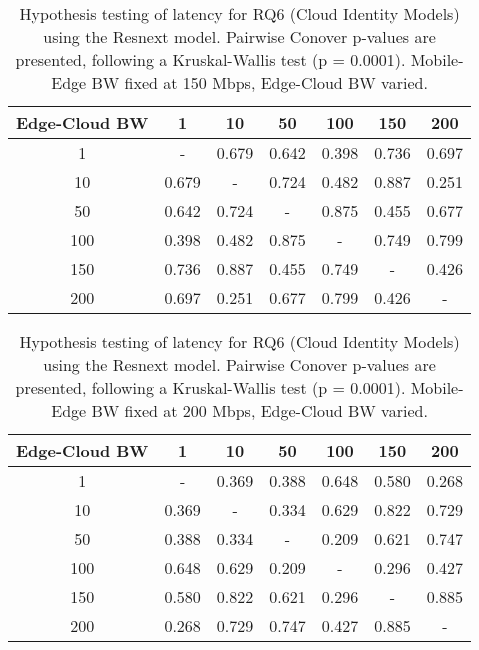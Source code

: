 \begin{table}[H]
\caption{Hypothesis testing of latency for RQ6 (Cloud Identity Models) using the Resnext model. Pairwise Conover p-values are presented, following a Kruskal-Wallis test (p = 0.0001). Mobile-Edge BW fixed at 150 Mbps, Edge-Cloud BW varied.}
\centering
\begin{tabular}{c|cccccc}
Edge-Cloud BW & 1 & 10 & 50 & 100 & 150 & 200 \\
\hline
1 & - & 0.679 & 0.642 & 0.398 & 0.736 & 0.697 \\
10 & 0.679 & - & 0.724 & 0.482 & 0.887 & 0.251 \\
50 & 0.642 & 0.724 & - & 0.875 & 0.455 & 0.677 \\
100 & 0.398 & 0.482 & 0.875 & - & 0.749 & 0.799 \\
150 & 0.736 & 0.887 & 0.455 & 0.749 & - & 0.426 \\
200 & 0.697 & 0.251 & 0.677 & 0.799 & 0.426 & - \\
\end{tabular}
\end{table}

\begin{table}[H]
\caption{Hypothesis testing of latency for RQ6 (Cloud Identity Models) using the Resnext model. Pairwise Conover p-values are presented, following a Kruskal-Wallis test (p = 0.0001). Mobile-Edge BW fixed at 200 Mbps, Edge-Cloud BW varied.}
\centering
\begin{tabular}{c|cccccc}
Edge-Cloud BW & 1 & 10 & 50 & 100 & 150 & 200 \\
\hline
1 & - & 0.369 & 0.388 & 0.648 & 0.580 & 0.268 \\
10 & 0.369 & - & 0.334 & 0.629 & 0.822 & 0.729 \\
50 & 0.388 & 0.334 & - & 0.209 & 0.621 & 0.747 \\
100 & 0.648 & 0.629 & 0.209 & - & 0.296 & 0.427 \\
150 & 0.580 & 0.822 & 0.621 & 0.296 & - & 0.885 \\
200 & 0.268 & 0.729 & 0.747 & 0.427 & 0.885 & - \\
\end{tabular}
\end{table}

